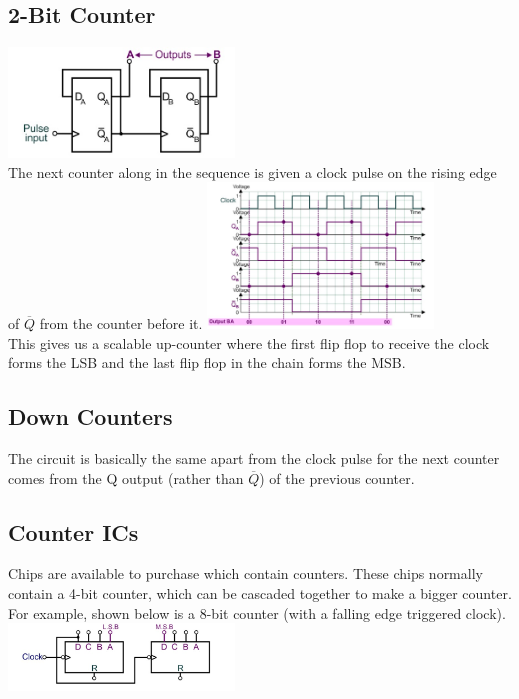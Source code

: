 \documentclass[a4paper,11pt, twocolumn]{article}
\begin{document}
\subsection{2-Bit Counter}
\includegraphics[width=0.45\textwidth]{2BitCounter.jpg}\\
The next counter along in the sequence is given a clock pulse on the rising edge of $\overline{Q}$ from the counter before it.
\includegraphics[width=0.45\textwidth]{2BitCounterGraph.jpg}\\
This gives us a scalable up-counter where the first flip flop to receive the clock forms the LSB and the last flip flop in the chain forms the MSB.
\subsection{Down Counters}
The circuit is basically the same apart from the clock pulse for the next counter comes from the Q output (rather than $\overline{Q}$) of the previous counter. 
\subsection{Counter ICs}
Chips are available to purchase which contain counters. These chips normally contain a 4-bit counter, which can be cascaded together to make a bigger counter. For example, shown below is a 8-bit counter (with a falling edge triggered clock).
\includegraphics[width=0.45\textwidth]{8BitIC.jpg}
\end{document}
